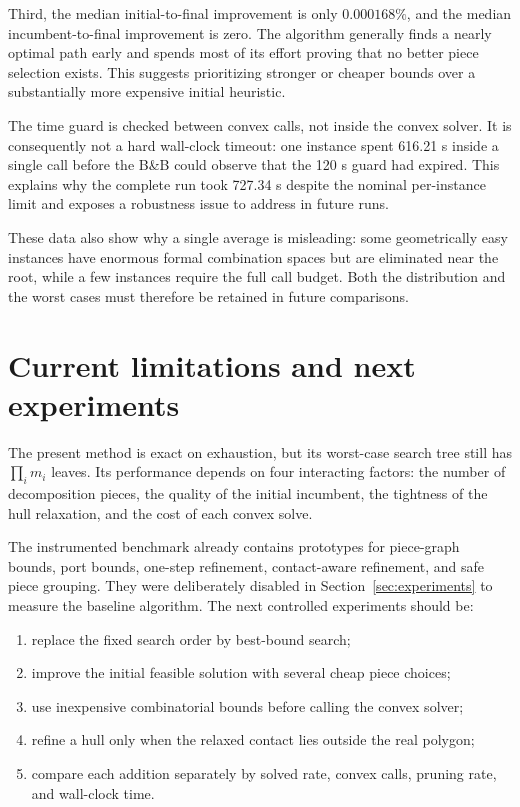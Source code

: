 \documentclass[11pt]{article}
\begin{document}
Third, the median initial-to-final improvement is only $0.000168\%$, and the
median incumbent-to-final improvement is zero. The algorithm generally finds
a nearly optimal path early and spends most of its effort proving that no
better piece selection exists. This suggests prioritizing stronger or cheaper
bounds over a substantially more expensive initial heuristic.

The time guard is checked between convex calls, not inside the convex solver.
It is consequently not a hard wall-clock timeout: one instance spent 616.21 s
inside a single call before the B\&B could observe that the 120 s guard had
expired. This explains why the complete run took 727.34 s despite the nominal
per-instance limit and exposes a robustness issue to address in future runs.

These data also show why a single average is misleading: some geometrically
easy instances have enormous formal combination spaces but are eliminated near
the root, while a few instances require the full call budget. Both the
distribution and the worst cases must therefore be retained in future
comparisons.

\section{Current limitations and next experiments}

The present method is exact on exhaustion, but its worst-case search tree still
has $\prod_i m_i$ leaves. Its performance depends on four interacting factors:
the number of decomposition pieces, the quality of the initial incumbent, the
tightness of the hull relaxation, and the cost of each convex solve.

The instrumented benchmark already contains prototypes for piece-graph bounds,
port bounds, one-step refinement, contact-aware refinement, and safe piece
grouping. They were deliberately disabled in Section~\ref{sec:experiments} to
measure the baseline algorithm. The next controlled experiments should be:
\begin{enumerate}
	\item replace the fixed search order by best-bound search;
	\item improve the initial feasible solution with several cheap piece choices;
	\item use inexpensive combinatorial bounds before calling the convex solver;
	\item refine a hull only when the relaxed contact lies outside the real polygon;
	\item compare each addition separately by solved rate, convex calls, pruning
	rate, and wall-clock time.
\end{enumerate}
\end{document}
